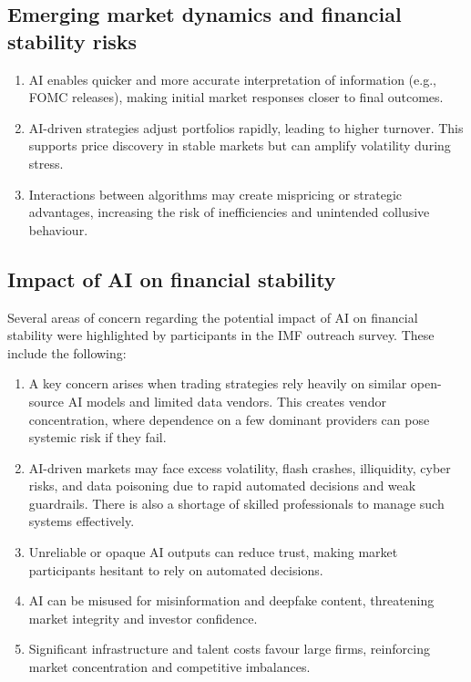 \subsection*{Emerging market dynamics and financial stability risks}

\begin{enumerate}[label=\textbf{\alph*)}]
\item {} AI enables quicker and more accurate
interpretation of information (e.g., FOMC releases), making initial market responses closer
to final outcomes.
\item {} AI-driven strategies adjust portfolios
rapidly, leading to higher turnover. This supports price discovery in stable markets but can
amplify volatility during stress.
\item {} Interactions between
algorithms may create mispricing or strategic advantages, increasing the risk of
inefficiencies and unintended collusive behaviour.
\end{enumerate}


\subsection*{Impact of AI on financial stability}

Several areas of concern regarding the potential impact of AI on financial stability were
highlighted by participants in the IMF outreach survey. These include the following:

\begin{enumerate}[label=\textbf{\alph*)}]
\item {} A key concern arises when trading strategies rely
heavily on similar open-source AI models and limited data vendors. This creates vendor
concentration, where dependence on a few dominant providers can pose systemic risk if they
fail.
\item {} AI-driven markets may face excess volatility, flash crashes,
illiquidity, cyber risks, and data poisoning due to rapid automated decisions and weak
guardrails. There is also a shortage of skilled professionals to manage such systems
effectively.
\item {} Unreliable or opaque AI outputs
can reduce trust, making market participants hesitant to rely on automated decisions.
\item {} AI can be misused for misinformation and deepfake content,
threatening market integrity and investor confidence.
\item {} Significant infrastructure and talent costs favour large firms,
reinforcing market concentration and competitive imbalances.
\end{enumerate}


